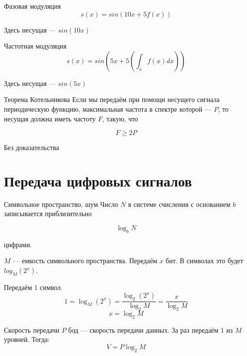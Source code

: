 \documentclass[xetex,aspectratio=43]{beamer}
\begin{document}
\begin{frame}{Фазовая модуляция}
	\[s(x) = sin(10x+5f(x))\]

	\begin{center}
		
	\end{center}


	Здесь несущая --- \(sin(10 x)\)
\end{frame}

\begin{frame}{Частотная модуляция}
	\[s(x) = sin\left(5x+5\left(\int_x f\left( x\right) dx \right)\right)\]

	\begin{center}
		
	\end{center}

	Здесь несущая --- \(sin(5 x)\)
\end{frame}

\begin{frame}{Теорема Котельникова}
	Если мы передаём при помощи несущего сигнала периодическую функцию,
	максимальная частота в спектре которой --- \(P\), то несущая должна
	иметь частоту \(F\), такую, что

	\[F \ge 2P\]

	Без доказательства
\end{frame}

\section{Передача цифровых сигналов}

\begin{frame}{Символьное пространство, шум}
	Число \(N\) в системе счисления с основанием \(b\) записывается
	приблизительно

	\[\log_b N\]

	цифрами.

	\pause

	\(M\) --- емкость символьного пространства. Передаём \(x\) бит. В
	символах это будет \(log_M (2^x)\).

	Передаём 1 символ.
	\[1 = \log_M (2^x) = \frac{\log_2 (2^x)}{\log_2 M} = \frac{x}{\log_2 M}\]
	\[x = \log_2 M\]
\end{frame}

\begin{frame}{Скорость передачи}
	\(P\) бод --- скорость передачи данных. За раз передаём 1 из \(M\)
	уровней. Тогда: \[V = P \log_2 M\]
\end{frame}
\end{document}
